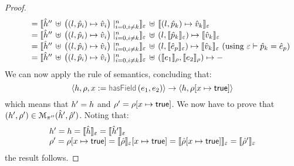 \begin{proof}
$$\begin{array}{l}
    \qquad = \semexpr{\sheap'' \, \uplus \, \big((l, \sexprp_i) \mapsto \sexprv_i\big)\mid_{i = 0, i\neq k}^n}{\senv} \dunion \semexpr{(l, \sexprp_k) \mapsto \sexprv_k}{\senv} \\
    \qquad = \semexpr{\sheap'' \, \uplus \, \big((l, \sexprp_i) \mapsto \sexprv_i\big)\mid_{i = 0, i\neq k}^n}{\senv} \dunion (l, \semexpr{\sexprp_k}{\senv}) \mapsto \semexpr{\sexprv_k}{\senv} \\ 
     \qquad = \semexpr{\sheap'' \, \uplus \, \big((l, \sexprp_i) \mapsto \sexprv_i\big)\mid_{i = 0, i\neq k}^n}{\senv} \dunion (l, \semexpr{\sexpr_p}{\senv}) \mapsto \semexpr{\sexprv_k}{\senv}
      			\text{ (using $\senv \vdash \sexprp_k = \sexpr_p$)} \\ 
     \qquad = \semexpr{\sheap'' \, \uplus \, \big((l, \sexprp_i) \mapsto \sexprv_i\big)\mid_{i = 0, i\neq k}^n}{\senv} \dunion (\symbeval{\jsilexpr_1}{\store}, \symbeval{\jsilexpr_2}{\store}) \mapsto - \\
\end{array}
$$
We can now apply the  rule of \jsil semantics, concluding that:  
$$
   \semtrans{\heap, \store, \jvar := \hasfield(\jsilexpr_1, \jsilexpr_2)}{\heap,  \store[\jvar \mapsto \jtrue]}
$$
which means that $\heap' = \heap$ and $\store' = \store[\jvar \mapsto \jtrue]$. 
%
We now have to prove that $(\heap', \store') \in \smodels{\sheap', \sstore'}{\pc''}$.
Noting that:
$$
\begin{array}{l}
\heap' = \heap = \semexpr{\sheap}{\senv} = \semexpr{\sheap'}{\senv} \\
 \store' = \store[\jvar \mapsto \jtrue] = \symbeval{\sstore}{\senv}[\jvar \mapsto \jtrue]  = \symbeval{\sstore[\jvar \mapsto \jtrue]}{\senv} = \symbeval{\sstore'}{\senv} 
\end{array}
$$
the result follows. 
\vspace{6pt}



\end{proof}
